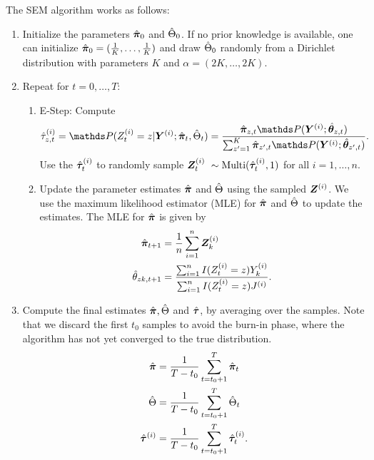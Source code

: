 The SEM algorithm works as follows:
\begin{enumerate}
    \item Initialize the parameters $\hat{\bm{\pi}}_0$ and $\hat{\Theta}_0$. If no prior
    knowledge is available, one can initialize $\hat{\bm{\pi}}_0 = (\frac{1}{K}, \ldots, \frac{1}{K})$ and
    draw $\hat{\Theta}_0$ randomly from a Dirichlet distribution with parameters $K$ and $\alpha =
    (2K, \ldots, 2K)$.

    \item Repeat for $t = 0, \ldots, T$:
    \begin{enumerate}
        \item E-Step: Compute
        \begin{align}
            \htau_{z,t}^{(i)} = \P(Z_{t}^{(i)} = z|
        \bY^{(i)}; \hbpi_{t}, \hTheta_{t}) = \frac{\hbpi_{z,t} \P(\bY^{(i)};
        \hbtheta_{z,t})}{\sum_{z' = 1}^K \hbpi_{z',t} \P(\bY^{(i)};
        \hbtheta_{z',t})}. \label{eq:tau}
        \end{align}
        Use the $\hat{\bm{\tau}}_t^{(i)}$ to randomly sample
        $\bm{Z}_{t}^{(i)} ~ \sim \text{Multi}(\hat{\bm{\tau}}_t^{(i)}, 1)$ for all $i = 1,\dots, n$.
        
        \item Update the parameter estimates $\hat{\bm{\pi}}$ and $\hat{\Theta}$ using the
        sampled $\bm{Z}^{(i)}$. We use the maximum likelihood estimator (MLE) for
        $\hat{\bm{\pi}}$ and $\hat{\Theta}$ to update the estimates. The MLE for $\hat{\bm{\pi}}$ is
        given by
        \begin{align}
            \hat{\bm{\pi}}_{t+1} &= \frac{1}{n} \sum_{i = 1}^n \bm{Z}_k^{(i)} \label{eq:pi_mle} \\
            \hat{\theta}_{zk,t+1} &= \frac{\sum_{i = 1}^n I(Z_t^{(i)} = z) Y_k^{(i)}}{\sum_{i = 1}^n I(Z_t^{(i)} = z) J^{(i)}}.\label{eq:theta_mle}
        \end{align}
    \end{enumerate}
    \item Compute the final estimates $\hat{\bm{\pi}}, \hat{\Theta}$ and $\hat{\bm{\tau}}$, by
        averaging over the samples. Note that we discard the first $t_0$ samples
        to avoid the burn-in phase, where the algorithm has not yet converged to
        the true distribution.
        \begin{align}
            \hat{\bm{\pi}} &= \frac{1}{T-t_0} \sum_{t=t_0 + 1}^T \hat{\bm{\pi}}_t \\
            \hat{\Theta} &= \frac{1}{T-t_0} \sum_{t=t_0 + 1}^T \hat{\Theta}_t \\
            \hat{\bm{\tau}}^{(i)} &= \frac{1}{T-t_0} \sum_{t=t_0 + 1}^T \hat{\bm{\tau}}_t^{(i)}.
        \end{align}
\end{enumerate}

